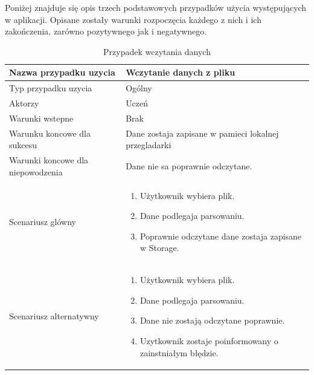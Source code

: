Poniżej znajduje się opis trzech podstawowych przypadków użycia występujących w aplikacji. Opisane zostały warunki rozpoczęcia każdego z nich i ich zakończenia, zarówno pozytywnego jak i negatywnego.

\begin{table}[H]
    \centering
    \begin{tabular}{|l<{\raggedright}|p{3in}|}
    \hline
    Nazwa przypadku uzycia & Wczytanie danych z pliku  \\ \hline
    Typ przypadku uzycia  & Ogólny  \\ \hline
    Aktorzy   & Uczeń    \\ \hline
    Warunki wstepne   & Brak     \\ \hline
    Warunku koncowe dla sukcesu   & Dane zostaja zapisane w pamieci lokalnej przegladarki    \\ \hline
    Warunki koncowe dla niepowodzenia   & Dane nie sa poprawnie odczytane.     \\ \hline
    Scenariusz glówny   &

    \begin{enumerate}
    \itemsep0em
        \item Użytkownik wybiera plik.
        \item Dane podlegaja parsowaniu.
        \item Poprawnie odczytane dane zostaja zapisane w Storage.
    \end{enumerate}
     \\ \hline
    Scenariusz alternatywny   &

    \begin{enumerate}
    \itemsep0em
        \item Użytkownik wybiera plik.
        \item Dane podlegaja parsowaniu.
        \item Dane nie zostają odczytane poprawnie.
        \item Uzytkownik zostaje poinformowany o zainstniałym błędzie.
    \end{enumerate}
         \\ \hline
    \end{tabular}
    \caption{Przypadek wczytania danych}
    \label{tab:caseuse1}
\end{table}

